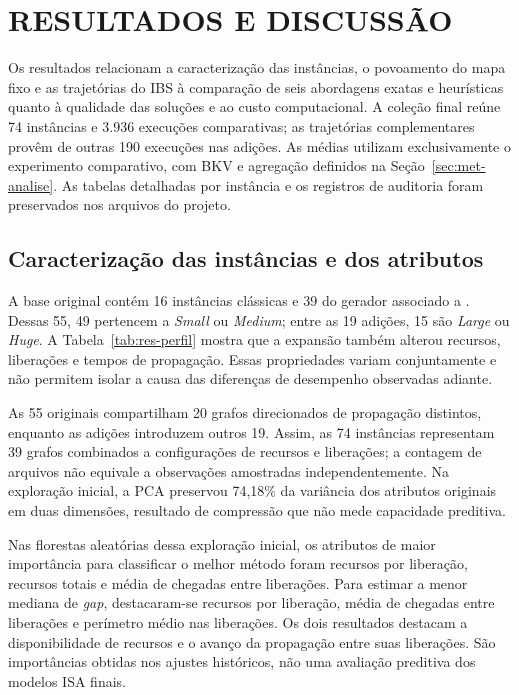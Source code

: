\chapter{\MakeUppercase{Resultados e discussão}}\label{sec:resultados-discussao}

Os resultados relacionam a caracterização das instâncias, o povoamento do
mapa fixo e as trajetórias do IBS à comparação de seis abordagens exatas
e heurísticas quanto à qualidade das soluções e ao custo computacional.
A coleção final reúne 74 instâncias e 3.936 execuções comparativas;
as trajetórias complementares provêm de outras 190 execuções nas adições.
As médias utilizam exclusivamente o experimento comparativo, com BKV e
agregação definidos na Seção~\ref{sec:met-analise}. As tabelas detalhadas
por instância e os registros de auditoria foram preservados nos arquivos
do projeto.

\section{Caracterização das instâncias e dos atributos}\label{sec:res-caracterizacao}

A base original contém 16 instâncias clássicas e 39 do gerador associado
a . Dessas 55, 49 pertencem a \textit{Small}
ou \textit{Medium}; entre as 19 adições, 15 são \textit{Large} ou
\textit{Huge}. A Tabela~\ref{tab:res-perfil} mostra que a expansão também
alterou recursos, liberações e tempos de propagação. Essas propriedades
variam conjuntamente e não permitem isolar a causa das diferenças de
desempenho observadas adiante.



As 55 originais compartilham 20 grafos direcionados de propagação distintos, enquanto
as adições introduzem outros 19. Assim, as 74 instâncias representam
39 grafos combinados a configurações de recursos e liberações; a contagem
de arquivos não equivale a observações amostradas independentemente.
Na exploração inicial, a PCA preservou 74,18\% da variância dos atributos
originais em duas dimensões, resultado de compressão que não mede
capacidade preditiva.

Nas florestas aleatórias dessa exploração inicial, os atributos de maior
importância para classificar o melhor método foram recursos por liberação,
recursos totais e média de chegadas entre liberações. Para estimar a menor
mediana de \textit{gap}, destacaram-se recursos por liberação, média de
chegadas entre liberações e perímetro médio nas liberações. Os dois
resultados destacam a disponibilidade de recursos e o avanço da propagação
entre suas liberações. São importâncias obtidas nos ajustes históricos,
não uma avaliação preditiva dos modelos ISA finais.

